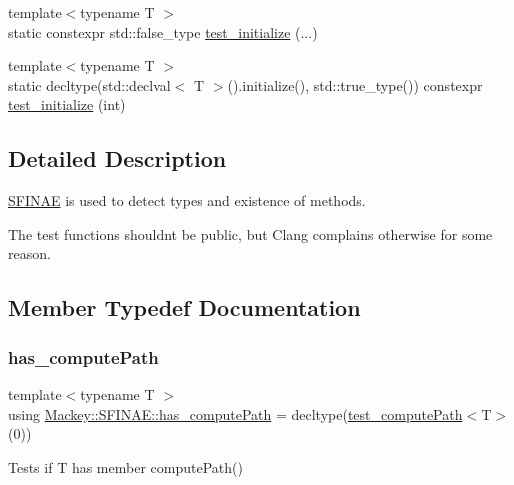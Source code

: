 \begin{DoxyCompactItemize}
\item 
{\footnotesize template$<$typename T $>$ }\\static constexpr std\+::false\+\_\+type \hyperlink{structMackey_1_1SFINAE_a1734bf7c631d052255bd1d5f96fb0b21}{test\+\_\+initialize} (...)
\item 
{\footnotesize template$<$typename T $>$ }\\static decltype(std\+::declval$<$ T $>$().initialize(), std\+::true\+\_\+type()) constexpr \hyperlink{structMackey_1_1SFINAE_a70818a71f0e6cead8c7f588600186701}{test\+\_\+initialize} (int)
\end{DoxyCompactItemize}


\subsection{Detailed Description}
\hyperlink{structMackey_1_1SFINAE}{S\+F\+I\+N\+AE} is used to detect types and existence of methods. 

The test functions shouldn\textquotesingle{}t be public, but Clang complains otherwise for some reason. 

\subsection{Member Typedef Documentation}
\mbox{\label{structMackey_1_1SFINAE_a970286ad57992a30d8a82eb73c727dec}} 
\subsubsection{\texorpdfstring{has\+\_\+compute\+Path}{has\_computePath}}
{\footnotesize\ttfamily template$<$typename T $>$ \\
using \hyperlink{structMackey_1_1SFINAE_a970286ad57992a30d8a82eb73c727dec}{Mackey\+::\+S\+F\+I\+N\+A\+E\+::has\+\_\+compute\+Path} =  decltype(\hyperlink{structMackey_1_1SFINAE_aa8d24c8b8818ab4d1613a127ad14f758}{test\+\_\+compute\+Path}$<$T$>$(0))}



Tests if T has member compute\+Path() 

\mbox{\label{structMackey_1_1SFINAE_a9f27bd555a411026939195401277642d}} 
